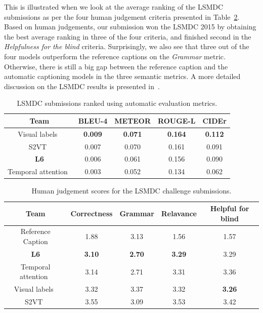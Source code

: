 This is illustrated when we look at the average ranking of the LSMDC submissions
as per the four human judgement criteria presented in
Table~\ref{tab:resLsmdcTestHum}.
Based on human judgements, our submission won the LSMDC 2015 by obtaining
the best average ranking in three of the four criteria, and finished second in the
\emph{Helpfulness for the blind} criteria.
Surprisingly, we also see that three out of the four models outperform the reference
captions on the \emph{Grammar} metric.
Otherwise, there is still a big gap between the reference caption and the automatic
captioning models in the three semantic metrics.
A more detailed discussion on the LSMDC results is presented
in~\cite{DBLP:journals/corr/RohrbachTRTPLCS16}.

\begin{table}[th]
  \centering
  \newcommand{\bs}{\small\bf}
  \begin{adjustbox}{center}
  \begin{tabular}{||c|c|c|c|c|}
    \hline\hline
    \bf Team  &\bs BLEU-4 &\bs METEOR &\bs ROUGE-L &\bs CIDEr \\\hline\hline
    Visual labels~\cite{rohrbach2015long} &\bf0.009&\bf0.071&\bf0.164&\bf0.112\\
    S2VT~\cite{venugopalan2015sequence} & 0.007 & 0.070 & 0.161 & 0.091\\
    \bf L6               & 0.006 & 0.061 & 0.156 & 0.090\\
    Temporal attention~\cite{yao2015describing} & 0.003 & 0.052 & 0.134 & 0.062\\\hline
    \hline
  \end{tabular}
  \end{adjustbox}
  \caption{LSMDC submissions ranked using automatic evaluation metrics.}
  \label{tab:resLsmdcTestMet}
\end{table}

\begin{table}[tbh]
  \centering
  \newcommand{\bs}{\small\bf}
  \begin{adjustbox}{center}
  \begin{tabular}{||c|c|c|c|c|}
    \hline\hline
    \bf Team  &\bs Correctness &\bs Grammar &\bs Relavance & \bf Helpful for blind\\\hline\hline
    Reference Caption    & 1.88  & 3.13  & 1.56  & 1.57\\\hline
    \bf L6               &\bf3.10&\bf2.70&\bf3.29&3.29\\
    Temporal attention~\cite{yao2015describing} & 3.14  & 2.71  & 3.31  & 3.36\\
    Visual labels~\cite{rohrbach2015long}& 3.32  & 3.37  & 3.32  &\bf3.26\\
    S2VT~\cite{venugopalan2015sequence}& 3.55  & 3.09  & 3.53  & 3.42\\
    \hline
  \end{tabular}
  \end{adjustbox}
  \caption{Human judgement scores for the LSMDC challenge submissions.}
  \label{tab:resLsmdcTestHum}
\end{table}

